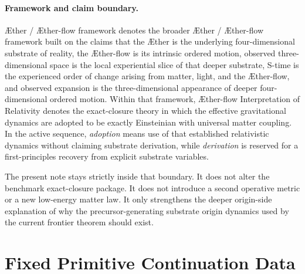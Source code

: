 \documentclass[11pt]{article}
\newcommand{\Aether}{\AE{}ther}
\newcommand{\Aflow}{\AE{}ther-flow}
\newcommand{\TheoryName}{\Aflow{} Interpretation of Relativity}
\newcommand{\TheoryProgram}{\Aether{} / \Aflow{} framework}
\begin{document}
\paragraph{Framework and claim boundary.}
\TheoryProgram{} denotes the broader \Aether{} / \Aflow{} framework built on the claims that the \Aether{} is the underlying four-dimensional substrate of reality, the \Aflow{} is its intrinsic ordered motion, observed three-dimensional space is the local experiential slice of that deeper substrate, S-time is the experienced order of change arising from matter, light, and the \Aflow{}, and observed expansion is the three-dimensional appearance of deeper four-dimensional ordered motion. Within that framework, \TheoryName{} denotes the exact-closure theory in which the effective gravitational dynamics are adopted to be exactly Einsteinian with universal matter coupling. In the active sequence, \emph{adoption} means use of that established relativistic dynamics without claiming substrate derivation, while \emph{derivation} is reserved for a first-principles recovery from explicit substrate variables.

The present note stays strictly inside that boundary. It does not alter the benchmark exact-closure package. It does not introduce a second operative metric or a new low-energy matter law. It only strengthens the deeper origin-side explanation of why the precursor-generating substrate origin dynamics used by the current frontier theorem should exist.

\section{Fixed Primitive Continuation Data}
\end{document}
